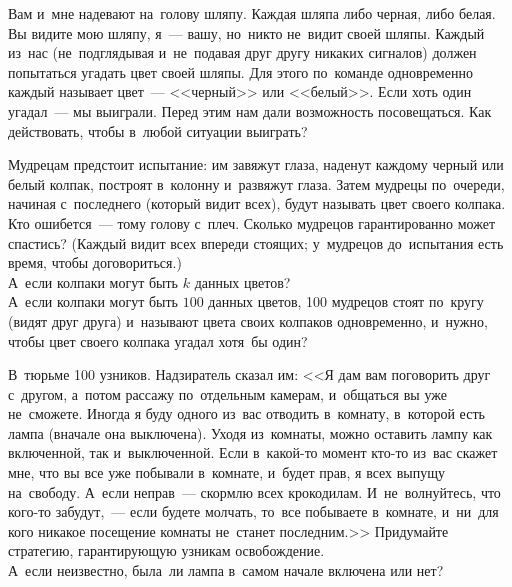 


\begin{problems}

\item
Вам и~мне надевают на~голову шляпу.
Каждая шляпа либо черная, либо белая.
Вы видите мою шляпу, я~--- вашу, но~никто не~видит своей шляпы.
Каждый из~нас (не~подглядывая и~не~подавая друг другу никаких сигналов) должен
попытаться угадать цвет своей шляпы.
Для этого по~команде одновременно каждый называет цвет~--- <<черный>> или
<<белый>>.
Если хоть один угадал~--- мы выиграли.
Перед этим нам дали возможность посовещаться.
Как действовать, чтобы в~любой ситуации выиграть?

\item
\subproblem
Мудрецам предстоит испытание: им завяжут глаза, наденут каждому черный или
белый колпак, построят в~колонну и~развяжут глаза.
Затем мудрецы по~очереди, начиная с~последнего (который видит всех), будут
называть цвет своего колпака.
Кто ошибется~--- тому голову с~плеч.
Сколько мудрецов гарантированно может спастись?
(Каждый видит всех впереди стоящих;
у~мудрецов до~испытания есть время, чтобы договориться.)
\\
\subproblem
А~если колпаки могут быть $k$ данных цветов?
\\
\subproblemx{*}
А~если колпаки могут быть $100$ данных цветов, 100 мудрецов стоят по~кругу
(видят друг друга) и~называют цвета своих колпаков одновременно, и~нужно, чтобы
цвет своего колпака угадал хотя~бы один?

\item
\subproblem
В~тюрьме 100 узников.
Надзиратель сказал им:
<<Я дам вам поговорить друг с~другом, а~потом рассажу по~отдельным камерам,
и~общаться вы уже не~сможете.
Иногда я буду одного из~вас отводить в~комнату, в~которой есть лампа (вначале
она выключена).
Уходя из~комнаты, можно оставить лампу как включенной, так
и~выключенной.
Если в~какой-то момент кто-то из~вас скажет мне, что вы все уже побывали в~комнате, и~будет прав, я всех выпущу на~свободу.
А~если неправ~--- скормлю всех крокодилам.
И~не~волнуйтесь, что кого-то забудут,~--- если будете молчать, то~все побываете
в~комнате, и~ни~для кого никакое посещение комнаты не~станет последним.>>
Придумайте стратегию, гарантирующую узникам освобождение.
\\
\subproblem
А~если неизвестно, была~ли лампа в~самом начале включена или нет?


\end{problems}
